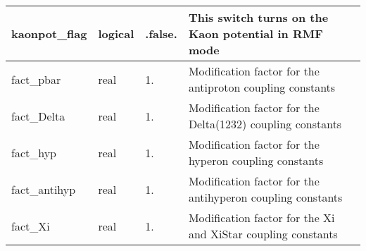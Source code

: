 \documentclass{article}
\begin{document}
\begin{longtable}{llll}
\midrule
kaonpot\_flag & \begin{minipage}[t]{2cm}logical\end{minipage} & \begin{minipage}[t]{2cm}.false.\end{minipage} & \begin{minipage}[t]{12cm}This switch turns on the Kaon potential in RMF mode\end{minipage}\\*
\midrule
fact\_pbar & \begin{minipage}[t]{2cm}real\end{minipage} & \begin{minipage}[t]{2cm}1.\end{minipage} & \begin{minipage}[t]{12cm}Modification factor for the antiproton coupling constants\end{minipage}\\*
\midrule
fact\_Delta & \begin{minipage}[t]{2cm}real\end{minipage} & \begin{minipage}[t]{2cm}1.\end{minipage} & \begin{minipage}[t]{12cm}Modification factor for the Delta(1232) coupling constants\end{minipage}\\*
\midrule
fact\_hyp & \begin{minipage}[t]{2cm}real\end{minipage} & \begin{minipage}[t]{2cm}1.\end{minipage} & \begin{minipage}[t]{12cm}Modification factor for the hyperon coupling constants\end{minipage}\\*
\midrule
fact\_antihyp & \begin{minipage}[t]{2cm}real\end{minipage} & \begin{minipage}[t]{2cm}1.\end{minipage} & \begin{minipage}[t]{12cm}Modification factor for the antihyperon coupling constants\end{minipage}\\*
\midrule
fact\_Xi & \begin{minipage}[t]{2cm}real\end{minipage} & \begin{minipage}[t]{2cm}1.\end{minipage} & \begin{minipage}[t]{12cm}Modification factor for the Xi and XiStar coupling constants\end{minipage}\\*

\end{longtable}
\end{document}
